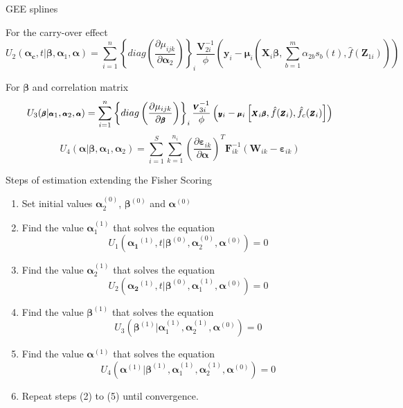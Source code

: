 \documentclass[t,9pt]{beamer}
\begin{document}
\begin{frame}[fragile]{GEE splines}

\begin{block}{For the carry-over effect}
\scriptsize
     \begin{equation}\nonumber
       U_2(\pmb{\alpha_c}, t|\pmb{\beta}, \pmb{\alpha}_1, \pmb{\alpha})=\sum_{i=1}^n \left\{ diag\left(\frac{\partial \mu_{ijk}}{\partial \pmb{\alpha}_2}\right)\right\}_i\frac {\pmb{V}^{-1}_{2i}}{\phi} \left(\pmb{y}_i-\pmb{\mu}_i\left(\pmb{X}_i \pmb{\beta},\sum_{b=1}^m \alpha_{2b}s_b(t)  ,\hat{f}(\pmb{Z}_{1i}) \right)\right)
     \end{equation}
 \end{block}
 \begin{block}{For $\pmb{\beta}$ and correlation matrix}
     \begin{equation}\nonumber \scriptsize
      U_3(\pmb{\beta}|\pmb{\alpha}_1, \pmb{\alpha}_2, \pmb{\alpha})=\sum_{i=1}^n \left\{  diag\left(\frac{\partial \mu_{ijk}}{\partial \pmb{\beta}}\right)\right\}_i\frac {\pmb{V}^{-1}_{3i}}{\phi} \left(\pmb{y}_i-\pmb{\mu}_i\left[\pmb{X}_i \pmb{\beta},\hat{f}(\pmb{Z}_{i}) ,\hat{f}_c(\pmb{Z}_{i}) \right]\right)
     \end{equation}
     \begin{equation}\nonumber
       U_4(\pmb{ \alpha}|\pmb{\beta}, \pmb{\alpha}_1, \pmb{\alpha}_2)=\sum_{i=1}^S \sum_{k=1}^{n_i}\left(\frac{\partial \pmb{\varepsilon}_{ik}}{\partial \pmb{ \alpha}} \right)^T \pmb{F}_{ik}^{-1} \left(\pmb{W}_{ik} - \pmb{\varepsilon}_{ik} \right)
     \end{equation}
 \end{block}
\end{frame}

\begin{frame}[fragile]{Steps of estimation extending the Fisher Scoring}
\small
\begin{enumerate}
    \item Set initial values  $\pmb{\alpha}_{2}^{(0)}$, $\pmb{\beta}^{(0)}$ and $\pmb{\alpha}^{(0)}$
    \item Find the value $\pmb{\alpha}_{1}^{(1)}$ that solves the equation
    \[U_1(\pmb{\alpha_1}^{(1)}, t|\pmb{\beta}^{(0)}, \pmb{\alpha}_2^{(0)}, \pmb{\alpha}^{(0)})=0\]  
 \item Find the value $\pmb{\alpha}_{2}^{(1)}$ that solves the equation
 \[U_2(\pmb{\alpha_2}^{(1)}, t|\pmb{\beta}^{(0)}, \pmb{\alpha}_1^{(1)}, \pmb{\alpha}^{(0)})=0\]  
 \item Find the value $\pmb{\beta}^{(1)}$ that solves the equation
 \[U_3(\pmb{\beta}^{(1)}|\pmb{\alpha}_1^{(1)}, \pmb{\alpha}_2^{(1)}, \pmb{\alpha}^{(0)})=0\]  
  \item Find the value $\pmb{\alpha}^{(1)}$ that solves the equation
 \[U_4(\pmb{\alpha}^{(1)}|\pmb{\beta}^{(1)},\pmb{\alpha}_1^{(1)}, \pmb{\alpha}_2^{(1)}, \pmb{\alpha}^{(0)})=0\]
 \item Repeat steps (2) to (5) until convergence.
\end{enumerate}
\end{frame}
\end{document}
